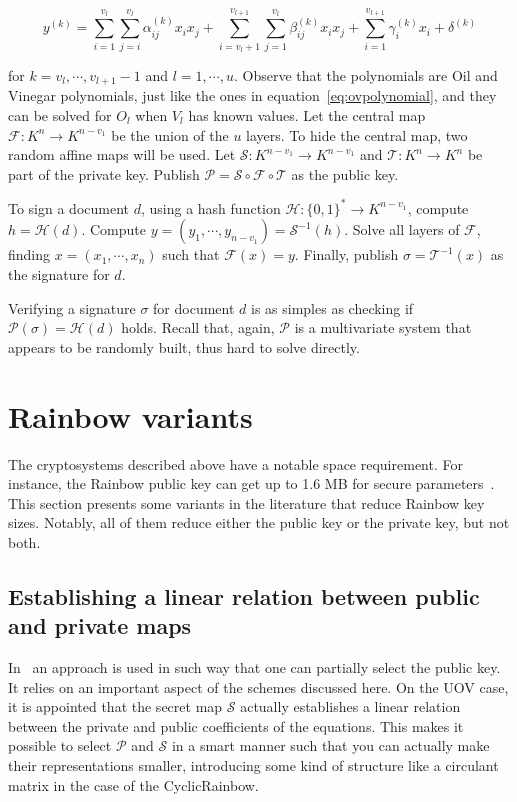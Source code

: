 \documentclass{ufsctex/ufsctex}
\begin{document}
\begin{equation}
y^{(k)} =
\sum_{i=1}^{v_l}\sum_{j=i}^{v_l} \alpha^{(k)}_{ij} x_i x_j +
\sum_{i=v_l+1}^{v_{l+1}}\sum_{j=1}^{v_l} \beta^{(k)}_{ij} x_i x_j +
\sum_{i=1}^{v_{l+1}} \gamma^{(k)}_{i} x_i +
\delta^{(k)}
\end{equation}

for $k = v_l, \cdots, v_{l+1} - 1$ and $l = 1, \cdots, u$. Observe that the
polynomials are Oil and Vinegar polynomials, just like the ones in
equation~\ref{eq:ovpolynomial}, and they can be solved for $O_l$ when $V_l$ has
known values. Let the central map $\mathcal{F}:K^{n} \to K^{n-v_1}$ be the
union of the $u$ layers. To hide the central map, two random affine maps will
be used. Let $\mathcal{S}:K^{n-v_1} \to K^{n-v_1}$ and $\mathcal{T}:K^{n} \to
K^{n}$ be part of the private key. Publish $\mathcal{P} = \mathcal{S} \circ
\mathcal{F} \circ \mathcal{T}$ as the public key.

To sign a document $d$, using a hash function $\mathcal{H}: \{0,1\}^* \to
K^{n-v_1}$, compute $h = \mathcal{H}(d)$. Compute $y = (y_1, \cdots, y_{n-v_1})
= \mathcal{S}^{-1}(h)$. Solve all layers of $\mathcal{F}$, finding $x = (x_1,
\cdots, x_n)$ such that $\mathcal{F}(x) = y$. Finally, publish $\sigma =
\mathcal{T}^{-1}(x)$ as the signature for $d$.

Verifying a signature $\sigma$ for document $d$ is as simples as checking if
$\mathcal{P}(\sigma) = \mathcal{H}(d)$ holds. Recall that, again, $\mathcal{P}$
is a multivariate system that appears to be randomly built, thus hard to solve
directly.

\section{Rainbow variants}

The cryptosystems described above have a notable space requirement. For
instance, the Rainbow public key can get up to 1.6 MB for secure
parameters~\cite{ding2017nist}. This section presents some variants in the
literature that reduce Rainbow key sizes. Notably, all of them reduce either
the public key or the private key, but not both.

\subsection{Establishing a linear relation between public and private maps}
\label{sec:relation}

In~\cite{petzoldt2010cyclicrainbow} an approach is used in such way that one
can partially select the public key. It relies on an important aspect of the
schemes discussed here. On the UOV case, it is appointed that the secret map
$\mathcal{S}$ actually establishes a linear relation between the private and
public coefficients of the equations. This makes it possible to select
$\mathcal{P}$ and $\mathcal{S}$ in a smart manner such that you can actually
make their representations smaller, introducing some kind of structure like a
circulant matrix in the case of the CyclicRainbow.
\end{document}
